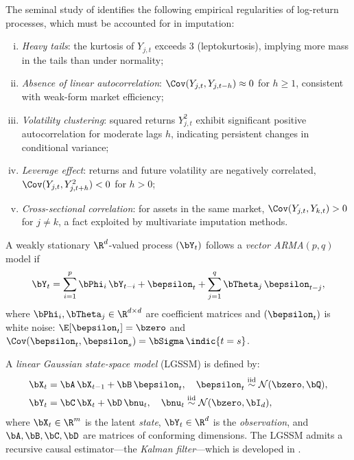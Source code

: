 \begin{remark}
\label{rem:stylized_facts}
The seminal study of \citet{cont2001} identifies the following empirical
regularities of log-return processes, which must be accounted for in
imputation:
\begin{enumerate}[(i)]
  \item \emph{Heavy tails}: the kurtosis of $Y_{j,t}$ exceeds 3
        (leptokurtosis), implying more mass in the tails than under
        normality;
  \item \emph{Absence of linear autocorrelation}: $\Cov(Y_{j,t},Y_{j,t-h})
        \approx 0$ for $h\ge 1$, consistent with weak-form market efficiency;
  \item \emph{Volatility clustering}: squared returns $Y_{j,t}^2$ exhibit
        significant positive autocorrelation for moderate lags
        $h$, indicating persistent changes in conditional variance;
  \item \emph{Leverage effect}: returns and future volatility are negatively
        correlated, $\Cov(Y_{j,t},Y_{j,t+h}^2)<0$ for $h>0$;
  \item \emph{Cross-sectional correlation}: for assets in the same market,
        $\Cov(Y_{j,t},Y_{k,t})>0$ for $j\ne k$, a fact exploited by
        multivariate imputation methods.
\end{enumerate}
\end{remark}

\begin{definition}
\label{def:arma}
A weakly stationary $\R^d$-valued process $(\bY_t)$ follows a
\emph{vector ARMA$(p,q)$} model if
\[
  \bY_t = \sum_{i=1}^{p} \bPhi_i\,\bY_{t-i}
        + \bepsilon_t
        + \sum_{j=1}^{q} \bTheta_j\,\bepsilon_{t-j},
\]
where $\bPhi_i,\bTheta_j\in\R^{d\times d}$ are coefficient matrices and
$(\bepsilon_t)$ is white noise:
$\E[\bepsilon_t]=\bzero$ and $\Cov(\bepsilon_t,\bepsilon_s)=\bSigma\,\indic{t=s}$.
\end{definition}

\begin{definition}
\label{def:lgssm}
A \emph{linear Gaussian state-space model} (LGSSM) is defined by:
\begin{align}
  \bX_t &= \bA\,\bX_{t-1} + \bB\,\bepsilon_t,
  \quad \bepsilon_t \stackrel{\mathrm{iid}}{\sim}
        \mathcal{N}(\bzero,\bQ),
  \label{eq:state_eq}\\
  \bY_t &= \bC\,\bX_t + \bD\,\bnu_t,
  \quad \bnu_t \stackrel{\mathrm{iid}}{\sim}
        \mathcal{N}(\bzero,\bI_d),
  \label{eq:obs_eq}
\end{align}
where $\bX_t\in\R^m$ is the latent \emph{state}, $\bY_t\in\R^d$ is the
\emph{observation}, and $\bA,\bB,\bC,\bD$ are matrices of conforming
dimensions.  The LGSSM admits a recursive causal estimator---the
\emph{Kalman filter}---which is developed in .
\end{definition}

